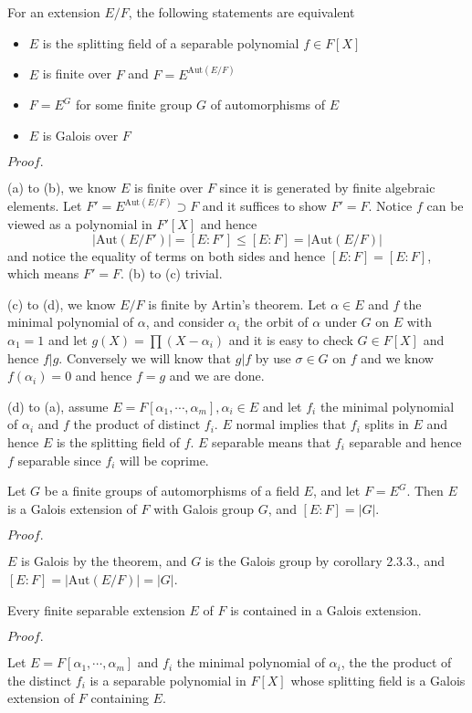 \documentclass{article}
\newcommand{\Pf}[1]{$Proof.$\par}
\begin{document}
\begin{theorem}
    For an extension $E/F$, the following statements are equivalent
    \begin{itemize}
        \item $E$ is the splitting field of a separable polynomial $f\in F[X]$
        \item $E$ is finite over $F$ and $F = E^{\text{Aut}(E/F)}$
        \item $F = E^G$ for some finite group $G$ of automorphisms of $E$
        \item $E$ is Galois over $F$
    \end{itemize}
\end{theorem}
\Pf\par
    (a) to (b), we know $E$ is finite over $F$ since it is generated by finite algebraic elements. Let $F' = E^{\text{Aut}(E/F)} \supset F$ and it suffices to show $F' = F$. Notice $f$ can be viewed as a polynomial in $F'[X]$ and hence
    \[|\text{Aut}(E/F')| = [E:F'] \leq [E:F] = |\text{Aut}(E/F)|\]
    and notice the equality of terms on both sides and hence $[E:F] = [E:F]$, which means $F' = F$. (b) to (c) trivial.\par
    (c) to (d), we know $E/F$ is finite by Artin's theorem. Let $\alpha \in E$ and $f$ the minimal polynomial of $\alpha$, and consider $\alpha_i$ the orbit of $\alpha$ under $G$ on $E$ with $\alpha_1 = 1$ and let $g(X) = \prod (X-\alpha_i)$ and it is easy to check $G\in F[X]$ and hence $f|g$. Conversely we will know that $g|f$ by use $\sigma\in G$ on $f$ and we know $f(\alpha_i) = 0 $ and hence $f=g$ and we are done.\par
    (d) to (a), assume $E = F[\alpha_1,\cdots,\alpha_m], \alpha_i \in E$ and let $f_i$ the minimal polynomial of $\alpha_i$ and $f$ the product of distinct $f_i$. $E$ normal implies that $f_i$ splits in $E$ and hence $E$ is the splitting field of $f$. $E$ separable means that $f_i$ separable and hence $f$ separable since $f_i$ will be coprime. 

\begin{corollary}
    Let $G$ be a finite groups of automorphisms of a field $E$, and let $F = E^G$. Then $E$ is a Galois extension of $F$ with Galois group $G$, and $[E:F] = |G|$.
\end{corollary}
\Pf\par
    $E$ is Galois by the theorem, and $G$ is the Galois group by corollary 2.3.3., and $[E:F] = |\text{Aut}(E/F)| = |G|$.

\begin{corollary}
    Every finite separable extension $E$ of $F$ is contained in a Galois extension.
\end{corollary}
\Pf\par
    Let $E = F[\alpha_1,\cdots,\alpha_m]$ and $f_i$ the minimal polynomial of $\alpha_i$, the the product of the distinct $f_i$ is a separable polynomial in $F[X]$ whose splitting field is a Galois extension of $F$ containing $E$.
\end{document}

